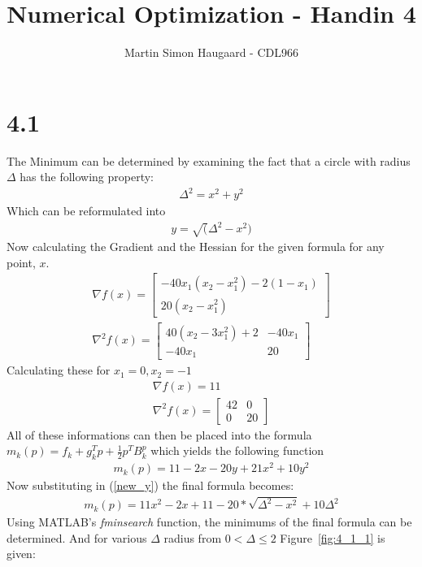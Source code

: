\documentclass[11pt]{article} %
\title{Numerical Optimization - Handin 4}
\author{Martin Simon Haugaard - CDL966}
\begin{document}
\maketitle
\section*{4.1}
The Minimum can be determined by examining the fact that a circle with radius $\Delta$ has the following property:
\begin{gather*}
\Delta^2 = x^2 +y^2
\end{gather*}
Which can be reformulated into
\begin{gather}
\label{new_y}
y = \sqrt(\Delta^2 - x^2)
\end{gather}
Now calculating the Gradient and the Hessian for the given formula for any point, $x$.
\begin{gather*}
\nabla f(x) = \begin{bmatrix}-40 x_1 (x_2 - x_1 ^2) - 2(1-x_1) \\ 20 (x_2 - x_ 1^2)\end{bmatrix}\\
\nabla^2 f(x) = \begin{bmatrix}40(x_2-3x_1^2)+2 & -40x_1 \\ -40x_1 & 20\end{bmatrix}
\end{gather*}
Calculating these for $x_1 = 0, x_2 = -1$
\begin{gather*}
\nabla f(x) = 11 \\
\nabla^2 f(x) = \begin{bmatrix}42 & 0 \\ 0 & 20\end{bmatrix}
\end{gather*}
All of these informations can then be placed into the formula $m_k(p) = f_k + g_k ^ T p + \frac{1}{2} p^T B_k ^p$ which yields the following function
\begin{gather*}
m_k(p) = 11 - 2x - 20y + 21 x^ 2 + 10 y ^2
\end{gather*}
Now substituting in (\ref{new_y}) the final formula becomes:
\begin{gather*} 
m_k(p) = 11 x^2 - 2x  + 11 - 20 * \sqrt{\Delta^2 - x^2} + 10 \Delta^2
\end{gather*}
Using MATLAB's \textit{fminsearch} function, the minimums of the final formula can be determined. And for various $\Delta$ radius from $0<\Delta \leq 2$ Figure~\ref{fig:4_1_1} is given:
\end{document}
